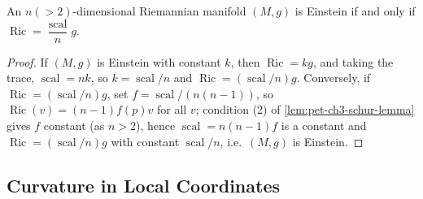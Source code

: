 \begin{corollary}[Corollary 3.1.6]
  \label{cor:pet-ch3-einstein-ricci-scalar-characterization}
  \leanok
  An $n(>2)$-dimensional Riemannian manifold $(M,g)$ is Einstein if and only if
  $\operatorname{Ric}=\dfrac{\operatorname{scal}}{n}g$.
\end{corollary}
\begin{proof}
  \leanok
  If $(M,g)$ is Einstein with constant $k$, then $\operatorname{Ric}=kg$, and taking the
  trace, $\operatorname{scal}=nk$, so $k=\operatorname{scal}/n$ and $\operatorname{Ric}=(\operatorname{scal}/n)g$.
  Conversely, if $\operatorname{Ric}=(\operatorname{scal}/n)g$, set $f=\operatorname{scal}/(n(n-1))$, so
  $\operatorname{Ric}(v)=(n-1)f(p)v$ for all $v$; condition (2) of
  \cref{lem:pet-ch3-schur-lemma} gives $f$ constant (as $n>2$), hence
  $\operatorname{scal}=n(n-1)f$ is a constant and $\operatorname{Ric}=(\operatorname{scal}/n)g$ with constant
  $\operatorname{scal}/n$, i.e.\ $(M,g)$ is Einstein.
\end{proof}

\subsection{Curvature in Local Coordinates}

